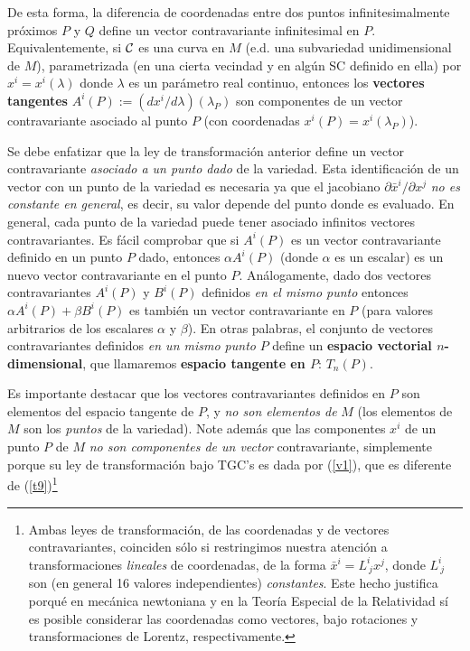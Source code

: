 De esta forma, la diferencia de coordenadas entre dos puntos infinitesimalmente próximos $P$ y $Q$ define un vector contravariante infinitesimal en $P$. Equivalentemente, si $\cal C$ es una curva en $M$ (e.d. una subvariedad unidimensional de $M$), parametrizada (en una cierta vecindad y en algún SC definido en ella) por $x^i=x^i(\lambda)$ donde $\lambda$ es un parámetro real continuo, entonces los \textbf{vectores tangentes} $A^ i(P):=(dx^i/d\lambda)(\lambda_P)$ son componentes de un vector contravariante asociado al punto $P$ (con coordenadas $x^i(P)=x^i(\lambda_P)$).

Se debe enfatizar que la ley de transformación anterior define un vector
contravariante \textit{asociado a un punto dado} de la variedad. Esta identificación de un vector con un punto de la variedad es necesaria ya que el jacobiano  ${\partial\bar{x}^i}/{\partial x^j}$ \textit{no es constante en general}, es decir, su valor depende del punto donde es evaluado. En general, cada punto de la variedad puede tener asociado infinitos vectores contravariantes. Es
fácil comprobar que si $A^i(P)$ es un vector contravariante definido en un
punto $P$ dado, entonces $\alpha A^i(P)$ (donde $\alpha$ es un escalar) es un
nuevo vector contravariante en el punto $P$. Análogamente, dado dos vectores
contravariantes $A^i(P)$ y $B^i(P)$ definidos \textit{en el mismo punto}
entonces $\alpha A^i(P)+\beta B^i(P)$ es también un vector contravariante en
$P$ (para valores arbitrarios de los escalares $\alpha$ y $\beta$). En otras
palabras, el conjunto de vectores contravariantes definidos \textit{en un mismo punto} $P$ define un \textbf{espacio vectorial $n$-dimensional}, que llamaremos \textbf{espacio tangente en $P$}: $T_n(P)$. 

Es importante destacar que los vectores contravariantes definidos en $P$ son
elementos del espacio tangente de $P$, y \textit{no son elementos de} $M$ (los
elementos de $M$ son los \textit{puntos} de la variedad). Note además que las componentes $x^i$ de un punto $P$ de $M$ \textit{no son componentes de un vector} contravariante, simplemente porque su ley de transformación bajo TGC's es dada por (\ref{v1}), que es diferente de (\ref{t9})\footnote{Ambas leyes de transformación, de las coordenadas y de vectores contravariantes, coinciden sólo si restringimos nuestra atención a transformaciones \textit{lineales} de coordenadas, de la forma $\bar{x}^i=L^i_{\ j}x^j$, donde $L^i_{\ j}$ son (en general 16 valores independientes) \textit{constantes}. Este hecho justifica porqué en mecánica newtoniana y en la Teoría Especial de la Relatividad sí es posible considerar las coordenadas como vectores, bajo rotaciones y transformaciones de Lorentz, respectivamente.}

